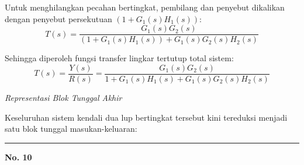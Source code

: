 \documentclass[11pt,a4paper]{article}
\begin{document}
Untuk menghilangkan pecahan bertingkat, pembilang dan penyebut dikalikan dengan penyebut persekutuan $(1 + G_1(s) H_1(s))$:
$$T(s) = \frac{G_1(s) G_2(s)}{\left( 1 + G_1(s) H_1(s) \right) + G_1(s) G_2(s) H_2(s)}$$

Sehingga diperoleh fungsi transfer lingkar tertutup total sistem:
$$T(s) = \frac{Y(s)}{R(s)} = \frac{G_1(s) G_2(s)}{1 + G_1(s) H_1(s) + G_1(s) G_2(s) H_2(s)}$$

\textit{Representasi Blok Tunggal Akhir}

Keseluruhan sistem kendali dua lup bertingkat tersebut kini tereduksi menjadi satu blok tunggal masukan-keluaran:

\begin{center}
\end{center}

\vspace{12pt}
\hrule
\vspace{10pt}

\textbf{\large No. 10}
\end{document}
